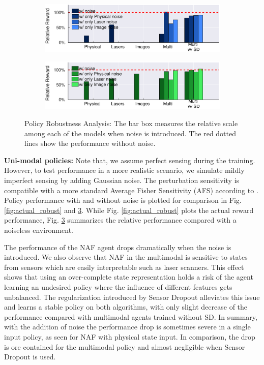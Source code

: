 \documentclass[../thesis.tex]{subfiles}
\begin{document}
\begin{figure}[t]
	\centering
	\begin{subfigure}[b]{0.48\linewidth}
    	\includegraphics[width=\columnwidth,trim= 45 180 45 25, clip=true]{./MultimodalDRL/fig/relative_robust_naf}
    	\label{fig:relative_robust_naf}
	\end{subfigure}
	\begin{subfigure}[b]{0.48\linewidth}
    	\includegraphics[width=\columnwidth,trim= 45 180 45 25, clip=true]{./MultimodalDRL/fig/relative_robust_ddpg}
    	\label{fig:relative_robust_ddpg}
	\end{subfigure}
	\caption{Policy Robustness Analysis: The bar box measures the relative scale among each of the models when noise is introduced. The red dotted lines show the performance without noise.}
	\label{fig:relative_robust}
\end{figure}
 
\textbf{Uni-modal policies:}
Note that, we assume perfect sensing during the training. However, to test performance in a more realistic scenario, we simulate mildly imperfect sensing by adding Gaussian noise. The perturbation sensitivity is compatible with a more standard Average Fisher Sensitivity (AFS) according to \cite{progressive_net}. Policy performance with and without noise is plotted for comparison in Fig. \ref{fig:actual_robust} and \ref{fig:relative_robust}. While Fig. \ref{fig:actual_robust} plots the actual reward performance, Fig. \ref{fig:relative_robust} summarizes the relative performance compared with a noiseless environment.
 
The performance of the NAF agent drops dramatically when the noise is introduced. We also observe that NAF in the multimodal is sensitive to states from sensors which are easily interpretable such as laser scanners. This effect shows that using an over-complete state representation holds a risk of the agent learning an undesired policy where the influence of different features gets unbalanced. The regularization introduced by Sensor Dropout alleviates this issue and learns a stable policy on both algorithms, with only slight decrease of the performance compared with multimodal agents trained without SD. In summary, with the addition of noise the performance drop is sometimes severe in a single input policy, as seen for NAF with physical state input. In comparison, the drop is ore contained for the multimodal policy and almost negligible when Sensor Dropout is used.
 
\end{document}
